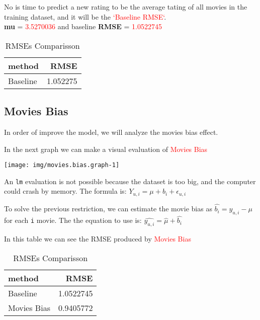 \documentclass[]{article}
\begin{document}
No is time to predict a new rating to be the average tating of all
movies in the training dataset, and it will be the
\textcolor{red}{`Baseline RMSE`}.\\
\textbf{mu} = \textcolor{red}{3.5270036} and baseline \textbf{RMSE} =
\textcolor{red}{1.0522745}

\begin{table}[!h]

\caption{\label{tab:table.RMSE.comparisson.baseline}RMSEs Comparisson}
\centering
\begin{tabular}{lr}
\toprule
method & RMSE\\
\midrule
\rowcolor{gray!6}  Baseline & 1.052275\\
\bottomrule
\end{tabular}
\end{table}

\hypertarget{movies-bias}{%
\subsection{Movies Bias}\label{movies-bias}}

In order of improve the model, we will analyze the movies bias effect.

In the next graph we can make a visual evaluation of
\textcolor{red}{Movies Bias}

\begin{center}\texttt{[image: img/movies.bias.graph-1]} \end{center}

An \texttt{lm} evaluation is not possible because the dataset is too
big, and the computer could crash by memory. The formula is:
\(Y_{u,i} = \mu + b_{i} + \epsilon_{u,i}\)

To solve the previous restriction, we can estimate the movie bias as
\(\hat{b_{i}} = y_{u,i} - \mu\) for each \texttt{i} movie. The the
equation to use is: \(\hat{y_{u,i}} = \hat{\mu} + \hat{b_{i}}\)

In this table we can see the RMSE produced by
\textcolor{red}{Movies Bias}

\begin{table}[!h]

\caption{\label{tab:movies.bias.table}RMSEs Comparisson}
\centering
\begin{tabular}{lr}
\toprule
method & RMSE\\
\midrule
\rowcolor{gray!6}  Baseline & 1.0522745\\
Movies Bias & 0.9405772\\
\bottomrule
\end{tabular}
\end{table}
\end{document}
